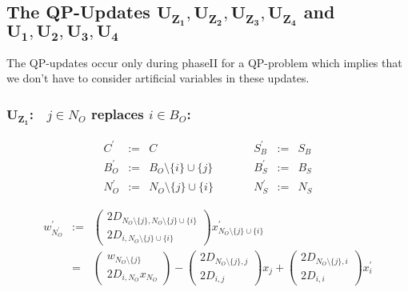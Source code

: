 \documentclass[a4paper]{article}
\begin{document}


\subsection{The QP-Updates $\mathbf{U_{Z_{1}}}, \mathbf{U_{Z_{2}}},
  \mathbf{U_{Z_{3}}}, \mathbf{U_{Z_{4}}}$ and $\mathbf{U_{1}}, \mathbf{U_{2}},
  \mathbf{U_{3}}, \mathbf{U_{4}}$}
The QP-updates occur only during phaseII for a QP-problem which implies that
we don't have to consider artificial variables in these updates.

\subsubsection{$\mathbf{U_{Z_{1}}}$:$\quad j \in N_{O}$ replaces $i \in B_{O}$:}
\begin{equation}
\label{update:o_z_rep_o}
\begin{array}{ccccccc}
C^{\prime}      &:=&  C
&\quad\quad&
S_{B}^{\prime}  &:=&  S_{B}  \\
B_{O}^{\prime}  &:=&  B_{O} \setminus \{i\} \cup \{j\}
&\quad\quad&
B_{S}^{\prime}  &:=&  B_{S} \\
N_{O}^{\prime}  &:=&  N_{O} \setminus\{j\} \cup \{i\}
&\quad\quad&
N_{S}^{\prime}  &:=&  N_{S}
\end{array}
\end{equation}

\begin{eqnarray}
w_{N_{O}^{\prime}}^{\prime}
&:=&
\left(
\begin{array}{c}
2D_{N_{O} \setminus\{j\}, N_{O} \setminus\{j\} \cup \{i\}} \\
\hline
2D_{i, N_{O} \setminus\{j\} \cup \{i\}}
\end{array}
\right)
x_{N_{O} \setminus\{j\} \cup \{i\}}^{\prime}
\nonumber \\
&=&
\left(
\begin{array}{c}
w_{N_{O} \setminus\{j\}} \\
\hline
2D_{i, N_{O}}x_{N_{O}}
\end{array}
\right)
-
\left(
\begin{array}{c}
2D_{N_{O} \setminus\{j\}, j} \\
\hline
2D_{i, j}
\end{array}
\right)
x_{j}
+
\left(
\begin{array}{c}
2D_{N_{O} \setminus\{j\}, i} \\
\hline
2D_{i, i}
\end{array}
\right)
x_{i}^{\prime}
\end{eqnarray}
\end{document}
